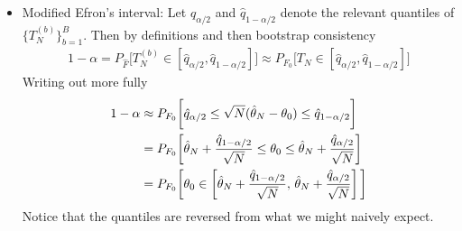 \documentclass[12pt]{article}
\theoremstyle{plain}
\theoremstyle{definition}
\theoremstyle{remark}
\begin{document}
\begin{itemize}
  \item
    Modified Efron's interval:
    Let $\hat{q}_{\alpha/2}$ and $\hat{q}_{1-\alpha/2}$ denote the
    relevant quantiles of $\{T_N^{(b)}\}_{b=1}^B$.
    Then by definitions and then bootstrap consistency
    \begin{align*}
      1-\alpha
      =
      P_{\hat{F}}
      \bigg[
        T_N^{(b)}\in [\hat{q}_{\alpha/2},\hat{q}_{1-\alpha/2}]
      \bigg]
      \approx
      P_{F_0}
      \bigg[
        T_N\in [\hat{q}_{\alpha/2},\hat{q}_{1-\alpha/2}]
      \bigg]
    \end{align*}
    Writing out more fully
    \begin{align*}
      1-\alpha
      &\approx
      P_{F_0}
      \bigg[
        \hat{q}_{\alpha/2}
        \leq
        \sqrt{N}(\hat{\theta}_N-\theta_0)
        \leq
        \hat{q}_{1-\alpha/2}
      \bigg]
      \\
      &=
      P_{F_0}
      \bigg[
        \hat{\theta}_N
        +
        \frac{%
          \hat{q}_{1-\alpha/2}
        }{%
          \sqrt{N}
        }
        \leq
        \theta_0
        \leq
        \hat{\theta}_N
        +
        \frac{%
          \hat{q}_{\alpha/2}
        }{%
          \sqrt{N}
        }
      \bigg]
      \\
      &=
      P_{F_0}
      \bigg[
        \theta_0
        \in
        \left[
        \hat{\theta}_N
        +
        \frac{%
          \hat{q}_{1-\alpha/2}
        }{%
          \sqrt{N}
        }
        ,\,
        \hat{\theta}_N
        +
        \frac{%
          \hat{q}_{\alpha/2}
        }{%
          \sqrt{N}
        }
        \right]
      \bigg]
    \end{align*}
    Notice that the quantiles are reversed from what we might naively
    expect.


\end{itemize}
\end{document}
